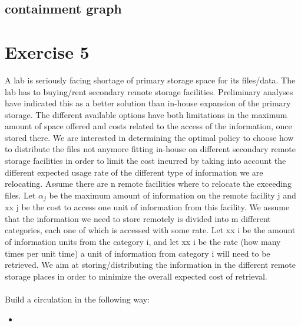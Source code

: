 \documentclass[]{article}
\begin{document}
\subsection{containment graph}


\section{Exercise 5}

A lab is seriously facing shortage of primary storage space for its files/data. The lab has to buying/rent
secondary remote storage facilities. Preliminary analyses have indicated this as a better solution than
in-house expansion of the primary storage. The different available options have both limitations in the
maximum amount of space offered and costs related to the access of the information, once stored there.
We are interested in determining the optimal policy to choose how to distribute the files not anymore
fitting in-house on different secondary remote storage facilities in order to limit the cost incurred by taking
into account the different expected usage rate of the different type of information we are relocating.
Assume there are n remote facilities where to relocate the exceeding files. Let $\alpha_j$ be the maximum
amount of information on the remote facility j and xx j be the cost to access one unit of information
from this facility. We assume that the information we need to store remotely is divided into m different
categories, each one of which is accessed with some rate. Let xx i be the amount of information units from
the category i, and let xx i be the rate (how many times per unit time) a unit of information from category
i will need to be retrieved. We aim at storing/distributing the information in the different remote storage
places in order to minimize the overall expected cost of retrieval.
\\\\
Build a circulation in the following way:
\begin{itemize}
  \item 
\end{itemize}
\end{document}
